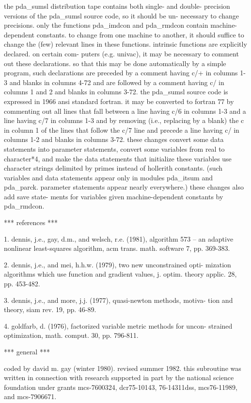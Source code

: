 \documentclass[11pt,twoside,nolof]{starlink}
\begin{document}
\begin{terminalv}
         the pda_sumsl distribution tape contains both single- and double-
      precision versions of the pda_sumsl source code, so it should be un-
      necessary to change precisions.
         only the functions pda_imdcon and pda_rmdcon contain machine-dependent
      constants.  to change from one machine to another, it should
      suffice to change the (few) relevant lines in these functions.
         intrinsic functions are explicitly declared.  on certain com-
      puters (e.g. univac), it may be necessary to comment out these
      declarations.  so that this may be done automatically by a simple
      program, such declarations are preceded by a comment having c/+
      in columns 1-3 and blanks in columns 4-72 and are followed by
      a comment having c/ in columns 1 and 2 and blanks in columns 3-72.
         the pda_sumsl source code is expressed in 1966 ansi standard
      fortran.  it may be converted to fortran 77 by commenting out all
      lines that fall between a line having c/6 in columns 1-3 and a
      line having c/7 in columns 1-3 and by removing (i.e., replacing
      by a blank) the c in column 1 of the lines that follow the c/7
      line and precede a line having c/ in columns 1-2 and blanks in
      columns 3-72.  these changes convert some data statements into
      parameter statements, convert some variables from real to
      character*4, and make the data statements that initialize these
      variables use character strings delimited by primes instead
      of hollerith constants.  (such variables and data statements
      appear only in modules pda_itsum and pda_parck.  parameter statements
      appear nearly everywhere.)  these changes also add save state-
      ments for variables given machine-dependent constants by pda_rmdcon.

   ***  references  ***

  1.  dennis, j.e., gay, d.m., and welsch, r.e. (1981), algorithm 573 --
              an adaptive nonlinear least-squares algorithm, acm trans.
              math. software 7, pp. 369-383.

  2.  dennis, j.e., and mei, h.h.w. (1979), two new unconstrained opti-
              mization algorithms which use function and gradient
              values, j. optim. theory applic. 28, pp. 453-482.

  3.  dennis, j.e., and more, j.j. (1977), quasi-newton methods, motiva-
              tion and theory, siam rev. 19, pp. 46-89.

  4.  goldfarb, d. (1976), factorized variable metric methods for uncon-
              strained optimization, math. comput. 30, pp. 796-811.

   ***  general  ***

      coded by david m. gay (winter 1980).  revised summer 1982.
      this subroutine was written in connection with research
      supported in part by the national science foundation under
      grants mcs-7600324, dcr75-10143, 76-14311dss, mcs76-11989,
      and mcs-7906671.



\end{terminalv}
\end{document}

